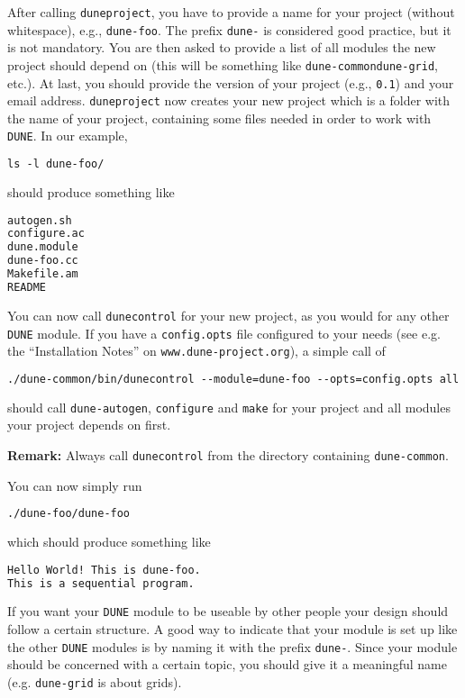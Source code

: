 \documentclass[11pt,a4paper,headinclude,footinclude,DIV16,normalheadings]{scrartcl}
\newcommand{\dune}{\texttt{DUNE}\xspace}
\newcommand{\autogen}{\texttt{dune-autogen}\xspace}
\newcommand{\configure}{\texttt{configure}\xspace}
\newcommand{\dunecommon}{\texttt{dune-common}\xspace}
\newcommand{\dunegrid}{\texttt{dune-grid}\xspace}
\newcommand{\dunecontrol}{\texttt{dunecontrol}\xspace}
\newcommand{\duneproject}{\texttt{duneproject}\xspace}
\newcommand{\make}{\texttt{make}\xspace}
\begin{document}
After calling \duneproject, you have to provide a name for your project
(without whitespace), e.g., \texttt{dune-foo}. 
The prefix \texttt{dune-} is considered good practice, but it is not
mandatory.
You are then asked to provide a
list of all modules the new project should depend on (this will be
something like \dunecommon \dunegrid, etc.). At last, you should provide
the version of your project (e.g., \texttt{0.1}) and your email address.
\duneproject now creates your new project which is a folder with the name of your project,
containing some files needed in order to work with \dune.
In our example,
 
\begin{lstlisting}[language=make]
ls -l dune-foo/
\end{lstlisting}
should produce something like

\begin{lstlisting}[language=make]
autogen.sh
configure.ac
dune.module
dune-foo.cc
Makefile.am
README
\end{lstlisting}

You can now call \dunecontrol for your new project, as you would for any other \dune module. If you have a \texttt{config.opts}\xspace
file configured to your needs (see e.g. the ``Installation Notes'' on
\texttt{www.dune-project.org}), a simple call of

\begin{lstlisting}[language=make]
./dune-common/bin/dunecontrol --module=dune-foo --opts=config.opts all
\end{lstlisting}
should call \autogen, \configure and \make for your
project and all modules your project depends on first.

\textbf{Remark:} Always call \dunecontrol from the directory
containing \dunecommon.

You can now  simply run

\begin{lstlisting}[language=make]
./dune-foo/dune-foo
\end{lstlisting}
which should produce something like

\begin{lstlisting}[language=make]
Hello World! This is dune-foo.
This is a sequential program.
\end{lstlisting}

If you want your \dune module to be useable by other people your design should
follow a certain structure. A good way to indicate that your module is set up
like the other \dune modules is by naming it with the prefix
\texttt{dune-}\xspace. 
Since your module should be concerned with a certain topic, you should give it
a meaningful name (e.g. \dunegrid is about grids). 
\end{document}
